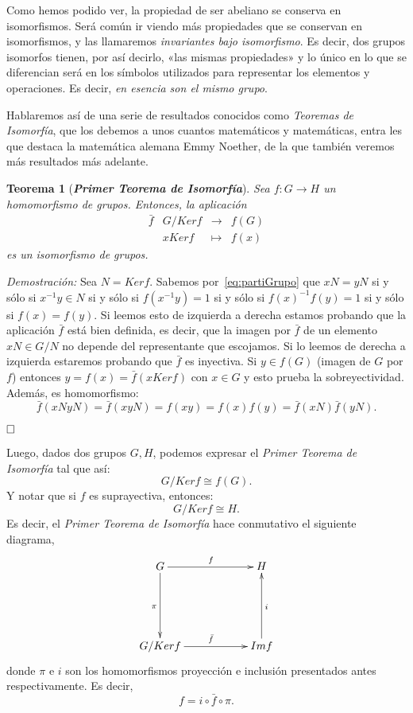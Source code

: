 \documentclass[12pt]{article}
\newtheorem{theorem}{Teorema}[section]
\begin{document}
Como hemos podido ver, la propiedad de ser abeliano se conserva en isomorfismos. Será común ir viendo más propiedades que se conservan en isomorfismos, y las llamaremos \textit{invariantes bajo isomorfismo}. Es decir, dos grupos isomorfos tienen, por así decirlo, «las mismas propiedades» y lo único en lo que se diferencian será en los símbolos utilizados para representar los elementos y operaciones. Es decir, \textit{en esencia son el mismo grupo}.

Hablaremos así de una serie de resultados conocidos como \textit{Teoremas de Isomorfía}, que los debemos a unos cuantos matemáticos y matemáticas, entra les que destaca la matemática alemana Emmy Noether, de la que también veremos más resultados más adelante.

\begin{theorem}[\textbf{\textit{Primer Teorema de Isomorfía}}]
Sea $f \colon G \longrightarrow H$ un homomorfismo de grupos. Entonces, la aplicación $$\begin{array}{rccl}
\bar{f} &G/Ker f&\longrightarrow &f(G) \\
&xKer f& \longmapsto &f(x)
\end{array}
$$
es un isomorfismo de grupos.
\end{theorem}
\emph{Demostración: }Sea $N = Ker f$. Sabemos por~\ref{eq:partiGrupo} que $xN = yN$ si y sólo si $x^{-1}y \in N$ si y sólo si $f(x^{-1}y)=1$ si y sólo si $f(x)^{-1}f(y) = 1$ si y sólo si $f(x)=f(y)$. Si leemos esto de izquierda a derecha estamos probando que la aplicación $\bar{f}$ está bien definida, es decir, que la imagen por $\bar{f}$ de un elemento $xN \in G/N$ no depende del representante que escojamos. Si lo leemos de derecha a izquierda estaremos probando que $\bar{f}$ es inyectiva. Si $y \in f(G)$ (imagen de $G$ por $f$) entonces $y=f(x)=\bar{f}(xKer f)$ con $x\in G$ y esto prueba la sobreyectividad. Además, es homomorfismo: $$\bar{f}(xNyN)= \bar{f}(xyN)=f(xy)=f(x)f(y) =\bar{f}(xN) \bar{f}(yN).$$ 

$\hfill \square$

Luego, dados dos grupos $G,H$, podemos expresar el \textit{Primer Teorema de Isomorfía} tal que así: $$G/Ker f \cong f(G).$$
Y notar que si $f$ es suprayectiva, entonces: $$G/Ker f \cong H.$$
Es decir, el \textit{Primer Teorema de Isomorfía} hace conmutativo el siguiente diagrama, $$\xymatrix @=2cm {G\ar[r]^{f} \ar[d]_\pi & H \\ G/Ker f \ar[r]^{\bar{f}} & Im f \ar[u]_{i}  }$$
donde $\pi$ e $i$ son los homomorfismos proyección e inclusión presentados antes respectivamente. Es decir, $$f = i \circ \bar{f} \circ \pi.$$
\end{document}
